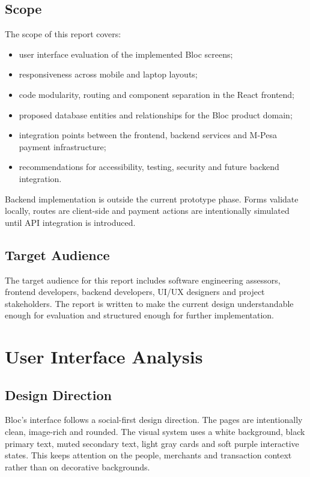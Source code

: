 \documentclass[12pt,a4paper]{article}
\begin{document}
\subsection{Scope}
The scope of this report covers:
\begin{itemize}
    \item user interface evaluation of the implemented Bloc screens;
    \item responsiveness across mobile and laptop layouts;
    \item code modularity, routing and component separation in the React frontend;
    \item proposed database entities and relationships for the Bloc product domain;
    \item integration points between the frontend, backend services and M-Pesa payment infrastructure;
    \item recommendations for accessibility, testing, security and future backend integration.
\end{itemize}

Backend implementation is outside the current prototype phase. Forms validate locally, routes are client-side and payment actions are intentionally simulated until API integration is introduced.

\subsection{Target Audience}
The target audience for this report includes software engineering assessors, frontend developers, backend developers, UI/UX designers and project stakeholders. The report is written to make the current design understandable enough for evaluation and structured enough for further implementation.

\section{User Interface Analysis}

\subsection{Design Direction}
Bloc's interface follows a social-first design direction. The pages are intentionally clean, image-rich and rounded. The visual system uses a white background, black primary text, muted secondary text, light gray cards and soft purple interactive states. This keeps attention on the people, merchants and transaction context rather than on decorative backgrounds.
\end{document}
